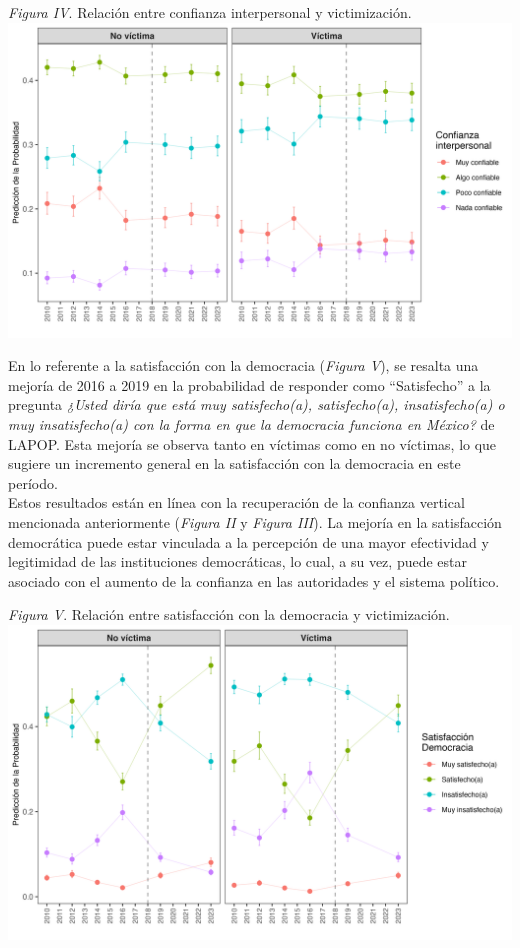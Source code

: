 \documentclass[letterpaper]{article}
\begin{document}
\vspace{-0.2cm}
\begin{center}
\emph{Figura IV}. Relación entre confianza interpersonal y victimización.
\includegraphics[width = 14cm]{plot_peer.png}
    \label{tab:Figura5}
\end{center}

En lo referente a la satisfacción con la democracia (\emph{Figura V}), se resalta una mejoría de 2016 a 2019 en la probabilidad de responder como “Satisfecho” a la pregunta \emph{¿Usted diría que está muy satisfecho(a), satisfecho(a), insatisfecho(a) o muy insatisfecho(a) con la forma en que la democracia funciona en México?} de LAPOP. Esta mejoría se observa tanto en víctimas como en no víctimas, lo que sugiere un incremento general en la satisfacción con la democracia en este período.\\[-1.5em]

Estos resultados están en línea con la recuperación de la confianza vertical mencionada anteriormente (\emph{Figura II} y \emph{Figura III}). La mejoría en la satisfacción democrática puede estar vinculada a la percepción de una mayor efectividad y legitimidad de las instituciones democráticas, lo cual, a su vez, puede estar asociado con el aumento de la confianza en las autoridades y el sistema político.\\[-1.5em]

\begin{center}
\emph{Figura V}. Relación entre satisfacción con la democracia y victimización.
\includegraphics[width = 14cm]{plot_dem.png}
    \label{tab:Figura6}
\end{center}
\end{document}
